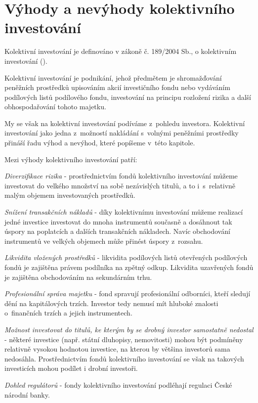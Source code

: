 \documentclass[a4paper,12pt]{article}
\begin{document}
\section{Výhody a nevýhody kolektivního investování}

Kolektivní investování je definováno v zákoně č. 189/2004 Sb., o kolektivním investování (\cite{zakon}).

Kolektivní investování je podnikání, jehož předmětem je
shromažďování peněžních prostředků upisováním akcií investičního fondu nebo vydáváním
podílových listů podílového fondu, investování na principu rozložení rizika a další
obhospodařování tohoto majetku.

My se však na kolektivní investování podíváme z~pohledu investora. Kolektivní investování jako jedna z~možností nakládání s~volnými peněžními prostředky přináší řadu výhod a nevýhod, které popíšeme v~této kapitole. 

\medskip

\noindent Mezi výhody kolektivního investování patří:
\begin{compactitem}
\item \emph{Diverzifikace rizika} - prostřednictvím fondů kolektivního investování můžeme investovat do velkého množství na sobě nezávislých titulů, a to i~s~relativně malým objemem investovaných prostředků. 

\item \emph{Snížení transakčních nákladů} - díky kolektivnímu investování můžeme realizací jedné investice investovat do mnoha instrumentů současně a dosáhnout tak úspory na poplatcích a dalších transakčních nákladech. Navíc obchodování instrumentů ve velkých objemech může přinést úspory z~rozsahu.
\item \emph{Likvidita vložených prostředků} - likvidita podílových listů otevřených podílových fondů je zajištěna právem podílníka na zpětný odkup. Likvidita uzavřených fondů je zajištěna obchodováním na sekundárním trhu.
\item \emph{Profesionální správa majetku} - fond spravují profesionální odborníci, kteří sledují dění na kapitálových trzích. Investor tedy nemusí mít hluboké znalosti o~finančních trzích a jejich instrumentech. 
\item \emph{Možnost investovat do titulů, ke kterým by se drobný investor samostatně nedostal} - některé investice (např. státní dluhopisy, nemovitosti) mohou být podmíněny relativně vysokou hodnotou investice, na kterou by většina investorů sama nedosáhla. Prostřednictvím fondů kolektivního investování se však na takových investicích mohou podílet i drobní investoři.
\item \emph{Dohled regulátorů} - fondy kolektivního investování podléhají regulaci České národní banky.
\end{compactitem}
\end{document}
